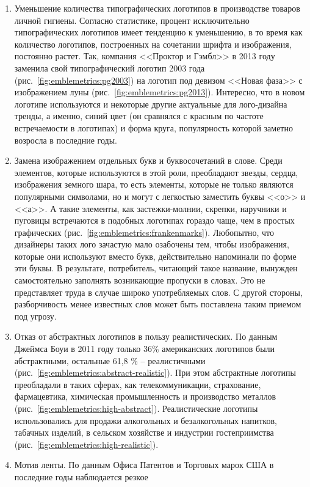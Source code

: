 \begin{enumerate}
\item Уменьшение количества  типографических логотипов в производстве товаров личной
  гигиены. Согласно статистике, процент исключительно типографических логотипов имеет тенденцию к
  уменьшению, в то время как количество логотипов,  построенных на сочетании шрифта и изображения,
  постоянно растет. Так, компания <<Проктор и Гэмбл>> в 2013 году заменила свой типографический
  логотип 2003 года (рис.~\ref{fig:emblemetrics:pg2003}) на  логотип  под девизом <<Новая фаза>>
  с изображением луны (рис.~\ref{fig:emblemetrics:pg2013}). Интересно, что в новом логотипе
  используются и некоторые другие актуальные для лого-дизайна тренды,  а именно, синий цвет (он
  сравнялся с красным по частоте встречаемости в логотипах) и форма круга, популярность которой
  заметно возросла в последние годы.
\item Замена изображением отдельных букв и буквосочетаний в слове. Среди элементов, которые
  используются в этой роли, преобладают звезды, сердца, изображения земного шара, то есть элементы,
  которые не только являются популярными символами, но и могут с легкостью заместить буквы <<о>> и
  <<а>>. А такие элементы, как застежки-молнии, скрепки, наручники и пуговицы встречаются в подобных
  логотипах гораздо чаще, чем в простых графических (рис.~\ref{fig:emblemetrics:frankenmarks}).
  Любопытно, что дизайнеры таких лого зачастую мало озабочены тем, чтобы изображения, которые они
  используют вместо букв, действительно напоминали по форме эти буквы. В результате, потребитель,
  читающий такое название, вынужден самостоятельно заполнять возникающие пропуски в словах. Это не
  представляет труда в случае широко употребляемых слов. С другой стороны,  разборчивость менее
  известных слов может быть поставлена таким приемом под угрозу.
\item Отказ от абстрактных логотипов в пользу реалистических. По данным Джеймса Боуи в 2011 году
  только 36\% американских логотипов были абстрактными, остальные 61,8 \% -- реалистичными
  (рис.~\ref{fig:emblemetrics:abstract-realistic}). При этом абстрактные логотипы преобладали в
  таких сферах, как телекоммуникации, страхование, фармацевтика, химическая промышленность и
  производство металлов (рис.~\ref{fig:emblemetrics:high-abstract}). Реалистические логотипы
  использовались для продажи алкогольных и безалкогольных напитков, табачных изделий, в сельском
  хозяйстве и индустрии гостеприимства (рис.~\ref{fig:emblemetrics:high-realistic}).
\item Мотив ленты. По данным Офиса Патентов и Торговых марок США в последние годы наблюдается резкое

\end{enumerate}
